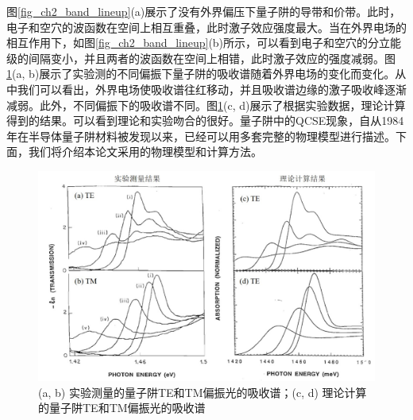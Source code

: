 图\ref{fig_ch2_band_lineup}(a)展示了没有外界偏压下量子阱的导带和价带。此时，电子和空穴的波函数在空间上相互重叠，此时激子效应强度最大。当在外界电场的相互作用下，如图\ref{fig_ch2_band_lineup}(b)所示，可以看到电子和空穴的分立能级的间隔变小，并且两者的波函数在空间上相错，此时激子效应的强度减弱。图\ref{fig_ch2_absorption_spec}(a, b)展示了实验测的不同偏振下量子阱的吸收谱随着外界电场的变化而变化\cite{chao1993momentum}。从中我们可以看出，外界电场使吸收谱往红移动，并且吸收谱边缘的激子吸收峰逐渐减弱。此外，不同偏振下的吸收谱不同。图\ref{fig_ch2_absorption_spec}(c, d)展示了根据实验数据，理论计算得到的结果\cite{chao1993momentum}。可以看到理论和实验吻合的很好。量子阱中的QCSE现象，自从1984年在半导体量子阱材料被发现以来\cite{miller1984band, wood1984high}，已经可以用多套完整的物理模型进行描述\cite{chuang1995physics}。下面，我们将介绍本论文采用的物理模型和计算方法。
\begin{figure}[htb]
	\centering
	\includegraphics[width=14cm]{./Pictures/fig_ch2_absorption_spec.jpg}
	\caption{ (a, b) 实验测量的量子阱TE和TM偏振光的吸收谱\cite{chao1993momentum}；(c, d) 理论计算的量子阱TE和TM偏振光的吸收谱\cite{chao1993momentum}}
	\label{fig_ch2_absorption_spec}
\end{figure}

